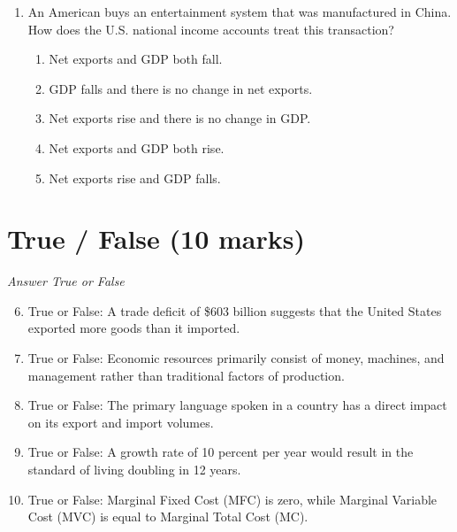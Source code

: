 \documentclass[12pt]{article}
\begin{document}
\begin{enumerate}[label=\arabic*.]
\begin{enumerate}[label=(\alph*)]
    \item price = marginal revenue.
    \item price = minimum average cost.
    \item price = minimum average variable cost.
    \item price = marginal cost.
\end{enumerate}
\item An American buys an entertainment system that was manufactured in China. How does the U.S. national income accounts treat this transaction?
\begin{enumerate}[label=(\alph*)]
    \item Net exports and GDP both fall.
    \item GDP falls and there is no change in net exports.
    \item Net exports rise and there is no change in GDP.
    \item Net exports and GDP both rise.
    \item Net exports rise and GDP falls.
\end{enumerate}
\end{enumerate}

\section*{True / False (10 marks)}
\textit{Answer True or False}
\begin{enumerate}[label=\arabic*.]
\setcounter{enumi}{5}
\item True or False: A trade deficit of \$603 billion suggests that the United States exported more goods than it imported.
\item True or False: Economic resources primarily consist of money, machines, and management rather than traditional factors of production.
\item True or False: The primary language spoken in a country has a direct impact on its export and import volumes.
\item True or False: A growth rate of 10 percent per year would result in the standard of living doubling in 12 years.
\item True or False: Marginal Fixed Cost (MFC) is zero, while Marginal Variable Cost (MVC) is equal to Marginal Total Cost (MC).
\end{enumerate}
\end{document}
